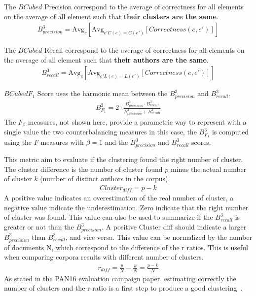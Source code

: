 \begin{definition}
  The $BCubed$ Precision correspond to the average of correctness for all elements on the average of all element such that \textbf{their clusters are the same}.
  \begin{gather*}
    B^3_{precision} = \text{Avg}_{e}[\text{Avg}_{e' C(e)=C(e')}[Correctness(e, e')]]
  \end{gather*}
\end{definition}

\begin{definition}
  The $BCubed$ Recall correspond to the average of correctness for all elements on the average of all element such that \textbf{their authors are the same}.
  \begin{gather*}
    B^3_{recall} = \text{Avg}_{e}[\text{Avg}_{e' L(e)=L(e')}[Correctness(e, e')]]
  \end{gather*}
\end{definition}

\begin{definition}
  $BCubed F_1$ Score uses the harmonic mean between the $B^3_{precision}$ and $B^3_{recall}$.
  \begin{gather*}
    B^3_{F_1} =
    2 \cdot \frac{B^3_{precision} \cdot B^3_{recall}}
    {B^3_{precision} + B^3_{recall}}
  \end{gather*}
  The $F_\beta$ measures, not shown here, provide a parametric way to represent with a single value the two counterbalancing measures in this case, the $B^3_{F_1}$ is computed using the $F$ measures with $\beta = 1$ and the $B^3_{precision}$ and $B^3_{recall}$ scores.
\end{definition}

\begin{definition}
  This metric aim to evaluate if the clustering found the right number of cluster.
  The cluster difference is the number of cluster found $p$ minus the actual number of cluster $k$ (number of distinct authors in the corpus).
  \begin{gather*}
    Cluster_{diff} = p - k
  \end{gather*}
  A positive value indicates an overestimation of the real number of cluster, a negative value indicate the underestimation.
  Zero indicate that the right number of cluster was found.
  This value can also be used to summarize if the $B^3_{recall}$ is greater or not than the $B^3_{precision}$.
  A positive Cluster diff should indicate a larger $B^3_{precision}$ than $B^3_{recall}$, and vice versa.
  This value can be normalized by the number of documents N, which correspond to the difference of the r ratios.
  This is useful when comparing corpora results with different number of clusters.
  \begin{gather*}
    r_{diff} = \frac{p}{N} - \frac{k}{N} = \frac{p - k}{N}
  \end{gather*}
  As stated in the PAN16 evaluation campaign paper, estimating correctly the number of clusters and the r ratio is a first step to produce a good clustering~\cite{pan16}.
\end{definition}
